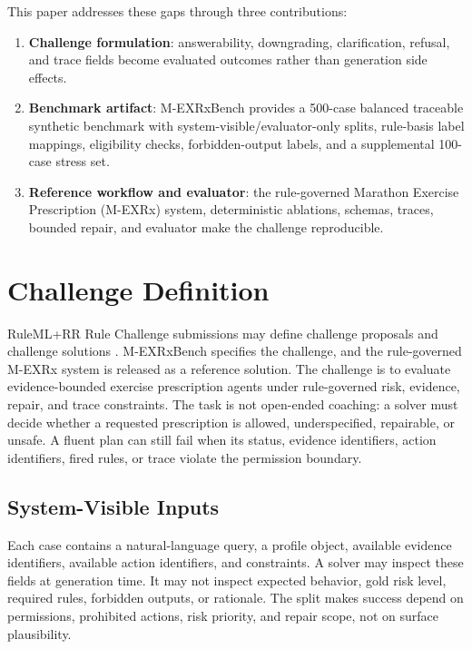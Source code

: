 \documentclass{ceurart}
\begin{document}
This paper addresses these gaps through three contributions:
\begin{enumerate}
  \item \textbf{Challenge formulation}: answerability, downgrading, clarification, refusal, and trace fields become evaluated outcomes rather than generation side effects.
  \item \textbf{Benchmark artifact}: M-EXRxBench provides a 500-case balanced traceable synthetic benchmark with system-visible/evaluator-only splits, rule-basis label mappings, eligibility checks, forbidden-output labels, and a supplemental 100-case stress set.
  \item \textbf{Reference workflow and evaluator}: the rule-governed Marathon Exercise Prescription (M-EXRx) system, deterministic ablations, schemas, traces, bounded repair, and evaluator make the challenge reproducible.
\end{enumerate}

\section{Challenge Definition}

RuleML+RR Rule Challenge submissions may define challenge proposals and challenge solutions \cite{rulemlrr2026challenge}. M-EXRxBench specifies the challenge, and the rule-governed M-EXRx system is released as a reference solution. The challenge is to evaluate evidence-bounded exercise prescription agents under rule-governed risk, evidence, repair, and trace constraints. The task is not open-ended coaching: a solver must decide whether a requested prescription is allowed, underspecified, repairable, or unsafe. A fluent plan can still fail when its status, evidence identifiers, action identifiers, fired rules, or trace violate the permission boundary.

\subsection{System-Visible Inputs}

Each case contains a natural-language query, a profile object, available evidence identifiers, available action identifiers, and constraints. A solver may inspect these fields at generation time. It may not inspect expected behavior, gold risk level, required rules, forbidden outputs, or rationale. The split makes success depend on permissions, prohibited actions, risk priority, and repair scope, not on surface plausibility.
\end{document}
